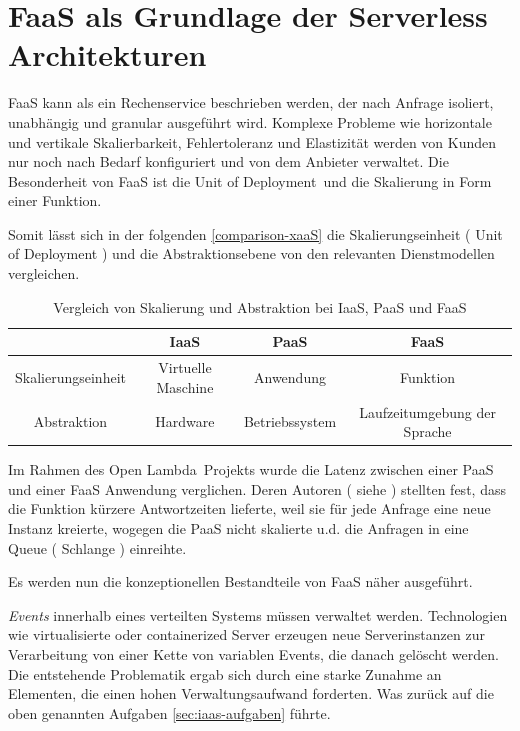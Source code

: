 \documentclass[
12pt,
english,
ngerman,
headsepline,
twoside,
openright,
numbers=noenddot,version=first
]{scrreprt}
\providecommand{\tabularnewline}{\\}
\begin{document}
\chapter{FaaS als Grundlage der Serverless Architekturen}%

\acrfull{FaaS}\label{sec:faas} kann als ein Rechenservice beschrieben werden, der nach Anfrage isoliert, unabhängig und granular ausgeführt wird. Komplexe Probleme wie horizontale und vertikale Skalierbarkeit, Fehlertoleranz und Elastizität werden von Kunden nur noch nach Bedarf konfiguriert und von dem Anbieter verwaltet. Die Besonderheit von \acrshort{FaaS} ist die \glqq Unit of Deployment\grqq\ und die Skalierung in Form einer Funktion. \cite{patternAWS}


Somit lässt sich in der folgenden \autoref{comparison-xaaS} die Skalierungseinheit ( Unit of Deployment ) und die Abstraktionsebene von den relevanten Dienstmodellen vergleichen. 
\begin{table}[H]
	\caption{Vergleich von Skalierung und Abstraktion bei IaaS, PaaS und FaaS }	
	\centering{}
	\begin{tabular}{ c | c c c }
		\noalign{\vskip\doublerulesep}
		& IaaS & PaaS & FaaS 
		\tabularnewline[\doublerulesep]	\hline	
		\noalign{\vskip\doublerulesep}
		Skalierungseinheit & Virtuelle Maschine & Anwendung & Funktion \tabularnewline
		Abstraktion & Hardware & Betriebssystem & Laufzeitumgebung der Sprache
	\end{tabular}
\label{comparison-xaaS}
\end{table}

Im Rahmen des \glqq Open Lambda\grqq\ Projekts wurde die Latenz zwischen einer \acrshort{PaaS} und einer \acrshort{FaaS} Anwendung verglichen. Deren Autoren ( siehe \cite{lambdaOpen} ) stellten fest, dass die Funktion kürzere Antwortzeiten lieferte, weil sie für jede Anfrage eine neue Instanz kreierte, wogegen die \acrshort{PaaS} nicht skalierte u.d. die Anfragen in eine Queue ( Schlange ) einreihte. 

Es werden nun die konzeptionellen Bestandteile von \acrshort{FaaS} näher ausgeführt.

\textit{Events}\label{par:event-reaction} innerhalb eines verteilten Systems müssen verwaltet werden. Technologien wie virtualisierte oder containerized Server erzeugen neue Serverinstanzen zur Verarbeitung von einer Kette von variablen Events, die danach gelöscht werden.\cite{lambdaAWS} Die entstehende Problematik ergab sich durch eine starke Zunahme an Elementen, die einen hohen Verwaltungsaufwand forderten.  Was zurück auf die oben genannten Aufgaben \autoref{sec:iaas-aufgaben} führte.
\end{document}
